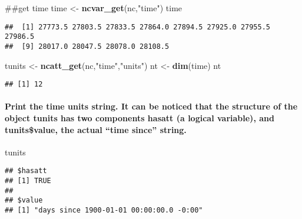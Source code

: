 \documentclass[]{article}
\newenvironment{Shaded}{\begin{snugshade}}{\end{snugshade}}
\newcommand{\KeywordTok}[1]{\textcolor[rgb]{0.13,0.29,0.53}{\textbf{#1}}}
\newcommand{\StringTok}[1]{\textcolor[rgb]{0.31,0.60,0.02}{#1}}
\newcommand{\NormalTok}[1]{#1}
\let\oldparagraph\paragraph
\renewcommand{\paragraph}[1]{\oldparagraph{#1}\mbox{}}
\begin{document}
\begin{Shaded}
\begin{Highlighting}[]
\NormalTok{##get time}
\NormalTok{time <-}\StringTok{ }\KeywordTok{ncvar_get}\NormalTok{(nc,}\StringTok{"time"}\NormalTok{)}
\NormalTok{time}
\end{Highlighting}
\end{Shaded}

\begin{verbatim}
##  [1] 27773.5 27803.5 27833.5 27864.0 27894.5 27925.0 27955.5 27986.5
##  [9] 28017.0 28047.5 28078.0 28108.5
\end{verbatim}

\begin{Shaded}
\begin{Highlighting}[]
\NormalTok{tunits <-}\StringTok{ }\KeywordTok{ncatt_get}\NormalTok{(nc,}\StringTok{"time"}\NormalTok{,}\StringTok{"units"}\NormalTok{)}
\NormalTok{nt <-}\StringTok{ }\KeywordTok{dim}\NormalTok{(time)}
\NormalTok{nt}
\end{Highlighting}
\end{Shaded}

\begin{verbatim}
## [1] 12
\end{verbatim}

\paragraph{\texorpdfstring{Print the time units string. It can be
noticed that the structure of the object tunits has two components
hasatt (a logical variable), and tunits\$value, the actual ``time
since''
string.}{Print the time units string. It can be noticed that the structure of the object tunits has two components hasatt (a logical variable), and tunits\$value, the actual time since string.}}\label{print-the-time-units-string.-it-can-be-noticed-that-the-structure-of-the-object-tunits-has-two-components-hasatt-a-logical-variable-and-tunitsvalue-the-actual-time-since-string.}

\begin{Shaded}
\begin{Highlighting}[]
\NormalTok{tunits}
\end{Highlighting}
\end{Shaded}

\begin{verbatim}
## $hasatt
## [1] TRUE
## 
## $value
## [1] "days since 1900-01-01 00:00:00.0 -0:00"
\end{verbatim}
\end{document}

